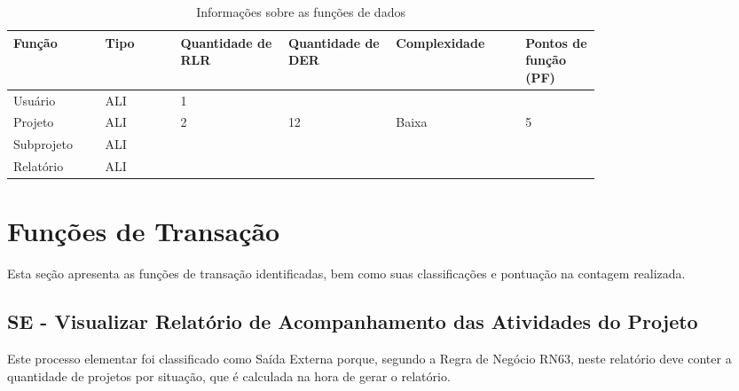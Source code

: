       \begin{table*}[!h]
      \centering
      \caption{Informações sobre as funções de dados}
      \label{funcoes_dados}
	\begin{tabular}{|p{0.12\linewidth}|p{0.10\linewidth}|p{0.14\linewidth}|p{0.14\linewidth}|p{0.17\linewidth}|p{0.10\linewidth}|}
	\hline
	\textbf{Função} & \textbf{Tipo} & \textbf{Quantidade de RLR} & \textbf{Quantidade de DER} & \textbf{Complexidade} & \textbf{Pontos de função (PF)} \\
	  \hline
	Usuário & ALI & 1 &  &  & \\
	\hline
	Projeto & ALI & 2 & 12 & Baixa & 5 \\
	\hline
	Subprojeto & ALI & &  & & \\
	\hline
	Relatório & ALI & &  & & \\
	\hline
	\end{tabular}
      \end{table*}

\vfill
\pagebreak
\section{Funções de Transação}
  
  Esta seção apresenta as funções de transação identificadas, bem como suas classificações e pontuação na contagem realizada.
    
  \subsection{SE - Visualizar Relatório de Acompanhamento das Atividades do Projeto}
  
    Este processo elementar foi classificado como Saída Externa porque, segundo a Regra de Negócio RN63, neste relatório
    deve conter a quantidade de projetos por situação, que é calculada na hora de gerar o relatório.
    
